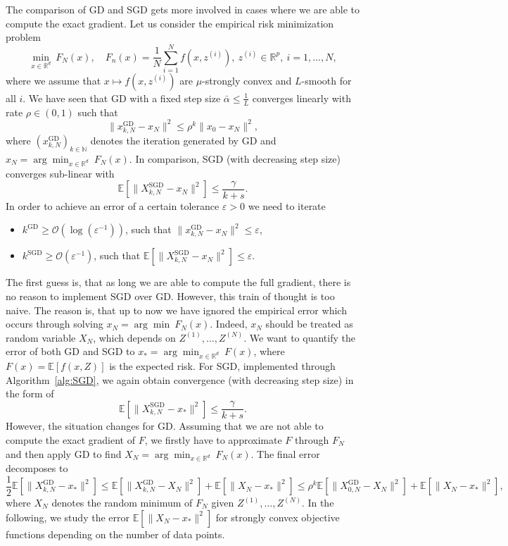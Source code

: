 \documentclass[12pt,openany]{book}
\theoremstyle{definition}
\theoremstyle{definition}
\newcommand{\cO}{\mathcal{O}}
\newcommand{\E}{\mathbb{E}}
\newcommand{\N}{\mathbb{N}}
\newcommand{\R}{\mathbb{R}}
\begin{document}
The comparison of GD and SGD gets more involved in cases where we are able to compute the exact gradient. Let us consider the empirical risk minimization problem 
\[\min_{x\in\R^d}\ F_N(x),\quad F_n(x) = \frac{1}{N}\sum_{i=1}^N f(x,z^{(i)}),\ z^{(i)}\in\R^p,\ i=1,\dots,N,\]
where we assume that $x\mapsto f(x,z^{(i)})$ are $\mu$-strongly convex and $L$-smooth for all $i$. We have seen that GD with a fixed step size $\bar\alpha\le \frac1L$ converges linearly with rate $\rho \in(0,1)$ such that
\[\|x_{k,N}^{\mathrm{GD}}-x_N\|^2\le \rho^{k}\|x_0-x_N\|^2, \]
where $(x_{k,N}^{\mathrm{GD}})_{k\in\N}$ denotes the iteration generated by GD and $x_N=\arg\min_{x\in\R^d}\ F_N(x)$. In comparison, SGD (with decreasing step size) converges sub-linear with
\[\E[\|X_{k,N}^{\mathrm{SGD}}-x_N\|^2] \le \frac{\gamma}{k+s}. \]
In order to achieve an error of a certain tolerance $\varepsilon>0$ we need to iterate 
\begin{itemize}
\item[(i)] $k^{\mathrm{GD}}\ge \cO(\log(\varepsilon^{-1}))$, such that $\|x_{k,N}^{\mathrm{GD}}-x_N\|^2\le\varepsilon$,
\item[(ii)] $k^{\mathrm{SGD}}\ge \cO(\varepsilon^{-1})$, such that $\E[\|X_{k,N}^{\mathrm{SGD}}-x_N\|^2]\le \varepsilon$.
\end{itemize}
The first guess is, that as long we are able to compute the full gradient, there is no reason to implement SGD over GD. However, this train of thought is too naive. The reason is, that up to now we have ignored the empirical error which occurs through solving $x_N=\arg\min\ F_N(x)$. Indeed, $x_N$ should be treated as random variable $X_N$, which depends on $Z^{(1)},\dots,Z^{(N)}$. We want to quantify the error of both GD and SGD to $x_\ast = \arg\min_{x\in\R^d}\ F(x)$, where $F(x) = \E[f(x,Z)]$ is the expected risk. For SGD, implemented through Algorithm~\ref{alg:SGD}, we again obtain convergence (with decreasing step size) in the form of 
\[\E[\|X_{k,N}^{\mathrm{SGD}}-x_\ast\|^2] \le \frac{\gamma}{k+s}.\]
However, the situation changes for GD. Assuming that we are not able to compute the exact gradient of $F$, we firstly have to approximate $F$ through $F_N$ and then apply GD to find $X_N = \arg\min_{x\in\R^d}\ F_N(x)$. The final error decomposes to
\[\frac12\E[ \|X_{k,N}^{\mathrm{GD}} - x_\ast\|^2] \le \E[\|X_{k,N}^{\mathrm{GD}}-X_N\|^2] + \E[\|X_N-x_\ast\|^2] \le \rho^k \E[\|X_{0,N}^{\mathrm{GD}}-X_N\|^2] + \E[\|X_N-x_\ast\|^2], \]
where $X_N$ denotes the random minimum of $F_N$ given $Z^{(1)},\dots,Z^{(N)}$. In the following, we study the error $\E[\|X_N-x_\ast\|^2]$ for strongly convex objective functions depending on the number of data points.
\end{document}
